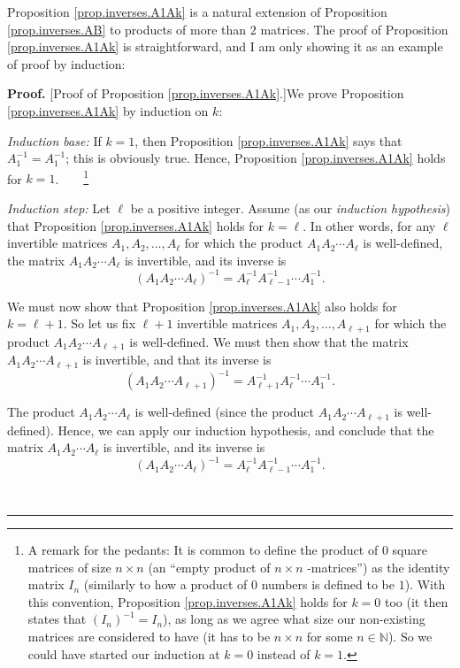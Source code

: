 \documentclass[numbers=enddot,12pt,final,onecolumn,notitlepage]{scrartcl}%
\theoremstyle{definition}
\newenvironment{proof}[1][Proof]{\noindent\textbf{#1.} }{\ \rule{0.5em}{0.5em}}
\begin{document}
Proposition \ref{prop.inverses.A1Ak} is a natural extension of Proposition
\ref{prop.inverses.AB} to products of more than $2$ matrices. The proof of
Proposition \ref{prop.inverses.A1Ak} is straightforward, and I am only showing
it as an example of proof by induction:

\begin{proof}
[Proof of Proposition \ref{prop.inverses.A1Ak}.]We prove Proposition
\ref{prop.inverses.A1Ak} by induction on $k$:

\textit{Induction base:} If $k=1$, then Proposition \ref{prop.inverses.A1Ak}
says that $A_{1}^{-1}=A_{1}^{-1}$; this is obviously true. Hence, Proposition
\ref{prop.inverses.A1Ak} holds for $k=1$.\ \ \ \ \footnote{A remark for the
pedants: It is common to define the product of $0$ square matrices of size
$n\times n$ (an \textquotedblleft empty product of $n\times n$%
-matrices\textquotedblright) as the identity matrix $I_{n}$ (similarly to how
a product of $0$ numbers is defined to be $1$). With this convention,
Proposition \ref{prop.inverses.A1Ak} holds for $k=0$ too (it then states that
$\left(  I_{n}\right)  ^{-1}=I_{n}$), as long as we agree what size our
non-existing matrices are considered to have (it has to be $n\times n$ for
some $n\in\mathbb{N}$). So we could have started our induction at $k=0$
instead of $k=1$.}

\textit{Induction step:} Let $\ell$ be a positive integer. Assume (as our
\textit{induction hypothesis}) that Proposition \ref{prop.inverses.A1Ak} holds
for $k=\ell$. In other words, for any $\ell$ invertible matrices $A_{1}%
,A_{2},\ldots,A_{\ell}$ for which the product $A_{1}A_{2}\cdots A_{\ell}$ is
well-defined, the matrix $A_{1}A_{2}\cdots A_{\ell}$ is invertible, and its
inverse is%
\[
\left(  A_{1}A_{2}\cdots A_{\ell}\right)  ^{-1}=A_{\ell}^{-1}A_{\ell-1}%
^{-1}\cdots A_{1}^{-1}.
\]


We must now show that Proposition \ref{prop.inverses.A1Ak} also holds for
$k=\ell+1$. So let us fix $\ell+1$ invertible matrices $A_{1},A_{2}%
,\ldots,A_{\ell+1}$ for which the product $A_{1}A_{2}\cdots A_{\ell+1}$ is
well-defined. We must then show that the matrix $A_{1}A_{2}\cdots A_{\ell+1}$
is invertible, and that its inverse is
\[
\left(  A_{1}A_{2}\cdots A_{\ell+1}\right)  ^{-1}=A_{\ell+1}^{-1}A_{\ell}%
^{-1}\cdots A_{1}^{-1}.
\]


The product $A_{1}A_{2}\cdots A_{\ell}$ is well-defined (since the product
$A_{1}A_{2}\cdots A_{\ell+1}$ is well-defined). Hence, we can apply our
induction hypothesis, and conclude that the matrix $A_{1}A_{2}\cdots A_{\ell}$
is invertible, and its inverse is%
\[
\left(  A_{1}A_{2}\cdots A_{\ell}\right)  ^{-1}=A_{\ell}^{-1}A_{\ell-1}%
^{-1}\cdots A_{1}^{-1}.
\]



\end{proof}
\end{document}
